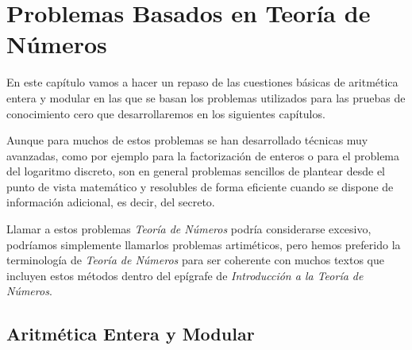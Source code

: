 \chapter{Problemas Basados en Teor\'ia de N\'umeros}\label{ch:preliminaresAlgebra}






En este cap\'itulo vamos a hacer un repaso de las cuestiones b\'asicas de
aritm\'etica entera y modular en las que se basan los problemas utilizados
para las pruebas de conocimiento cero que desarrollaremos en los siguientes
cap\'itulos.

Aunque para muchos de estos problemas se han desarrollado t\'ecnicas muy
avanzadas, como por ejemplo para la factorizaci\'on de enteros o para el
problema del logaritmo discreto, son en general problemas sencillos de
plantear desde el punto de vista matem\'atico y resolubles de forma
eficiente cuando se dispone de informaci\'on adicional, es decir, del
secreto.

Llamar a estos problemas {\em Teor\'ia de N\'umeros} podr\'ia considerarse
excesivo, podr\'iamos simplemente llamarlos problemas artim\'eticos, pero
hemos preferido la terminolog\'ia de {\em Teor\'ia de N\'umeros} para ser
coherente con muchos textos que incluyen estos m\'etodos dentro del
ep\'igrafe de {\em Introducci\'on a la Teor\'ia de N\'umeros}.

\section{Aritm\'etica Entera y Modular}

